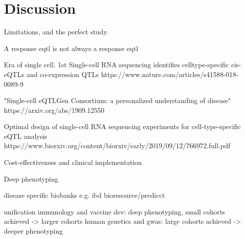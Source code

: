 %
%

\chapter{Discussion}

Limitations, and the perfect study.

A response eqtl is not always a response eqtl

Era of single cell.
    1st
    Single-cell RNA sequencing identifies celltype-specific cis-eQTLs and co-expression QTLs
    https://www.nature.com/articles/s41588-018-0089-9

    "Single-cell eQTLGen Consortium: a personalized understanding of disease"
    https://arxiv.org/abs/1909.12550

    Optimal design of single-cell RNA sequencing experiments for cell-type-specific eQTL analysis
    https://www.biorxiv.org/content/biorxiv/early/2019/09/12/766972.full.pdf


Cost-effectiveness and clinical implementation

Deep phenotyping
    
    disease specific biobanks e.g. ibd bioresource/predicct

unification
    immunology and vaccine dev: deep phenotyping, small cohorts achieved -> larger cohorts
    human genetics and gwas: large cohorts achieved -> deeper phenotyping

